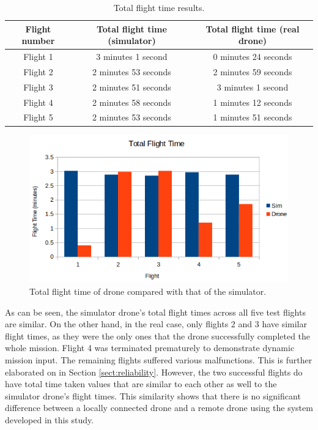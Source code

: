 \begin{table}[t]
  \caption{Total flight time results.}
  \begin{center}
    \begin{tabular}{|c|c|c|}
      \hline \textbf{Flight number} & \textbf{Total flight time (simulator)} & \textbf{Total flight time (real drone)} \\ \hline \hline
      Flight 1 & 3 minutes 1 second & 0 minutes 24 seconds\\ \hline
      Flight 2 & 2 minutes 53 seconds & 2 minutes 59 seconds \\ \hline
      Flight 3 & 2 minutes 51 seconds & 3 minutes 1 second\\ \hline 
      Flight 4 & 2 minutes 58 seconds & 1 minutes 12 seconds\\ \hline
      Flight 5 & 2 minutes 53 seconds & 1 minutes 51 seconds\\ \hline
    \end{tabular}
  \end{center}
  \label{table:flighttime}
\end{table} 

\begin{figure}[t]
	\includegraphics[width=\textwidth]{figures/Ch4/totaltimegraph.png}
	\caption{Total flight time of drone compared with that of the simulator.}
	\label{fig:totalflightgraph}
\end{figure}
\FloatBarrier

As can be seen, the simulator drone's total flight times across all five test flights are similar. On the other hand, in the real case, only flights 2 and 3 have similar flight times, as they were the only ones that the drone successfully completed the whole mission. Flight 4 was terminated prematurely to demonstrate dynamic mission input. The remaining flights suffered various malfunctions. This is further elaborated on in Section \ref{sect:reliability}. However, the two successful flights do have total time taken values that are similar to each other as well to the simulator drone's flight times. This similarity shows that there is no significant difference between a locally connected drone and a remote drone using the system developed in this study.

